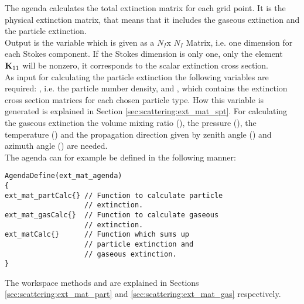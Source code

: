 \label{sec:scattering:gen_ext}

\label{sec:scattering:ext_mat_agenda}

The agenda  calculates the total extinction
matrix \ExtMat{}
for each grid point. It is the physical extinction matrix, that means
that it includes the gaseous extinction and the particle
extinction.\\
Output is the variable  which is given
as a $N_I$x $N_I$ Matrix, i.e. one dimension for each Stokes component. If the
Stokes dimension is only one, only the element ${\bf K}_{11}$ will be
nonzero, it corresponds to the scalar extinction cross section. \\
As input for calculating the particle extinction the following
variables are required:
, i.e. the particle number density, and 
, which contains the extinction cross section
matrices for each chosen particle type. How this variable is generated
is explained in Section \ref{sec:scattering:ext_mat_spt}. For calculating the
gaseous extinction the volume mixing ratio (), the
pressure (), the temperature  () and the
propagation direction given by zenith angle () and
azimuth angle () are needed.\\
The agenda can for example be defined in the following manner:

\begin{minipage}{0.9\hsize}
\begin{verbatim}
AgendaDefine(ext_mat_agenda)
{
ext_mat_partCalc{} // Function to calculate particle
                   // extinction.
ext_mat_gasCalc{}  // Function to calculate gaseous
                   // extinction. 
ext_matCalc{}      // Function which sums up
                   // particle extinction and 
                   // gaseous extinction.
}
\end{verbatim}
\end{minipage}

\vspace{2ex}
\noindent
The workspace methods  and
 are explained in Sections
\ref{sec:scattering:ext_mat_part} and \ref{sec:scattering:ext_mat_gas}
respectively.

